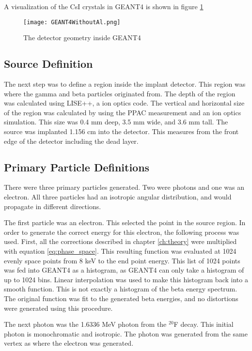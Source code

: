 \documentclass[../MaxHughesThesis.tex]{subfiles}
\begin{document}
A visualization of the CsI crystals in GEANT4 is shown in figure \ref{fig:GEANT4Det}

\begin{figure}[!htb]
	\centerline{\texttt{[image: GEANT4WithoutAl.png]}}
	\caption{The detector geometry inside GEANT4}
	\label{fig:GEANT4Det}
\end{figure}

\subsection{Source Definition}
The next step was to define a region inside the implant detector.
This region was where the gamma and beta particles originated from.
The depth of the region was calculated using LISE++, a ion optics code.
The vertical and horizontal size of the region was calculated by using the PPAC measurement and an ion optics simulation.
This size was 0.4 mm deep, 3.5 mm wide, and 3.6 mm tall.
The source was implanted 1.156 cm into the detector.
This measures from the front edge of the detector including the dead layer.

\subsection{Primary Particle Definitions}
There were three primary particles generated.
Two were photons and one was an electron.
All three particles had an isotropic angular distribution, and would propagate in different directions.

The first particle was an electron. 
This selected the point in the source region.
In order to generate the correct energy for this electron, the following process was used.
First, all the corrections described in chapter \ref{ch:theory} were multiplied with equation \ref{eq:phase_space}.
This resulting function was evaluated at 1024 evenly space points from 8 keV to the end point energy.
This list of 1024 points was fed into GEANT4 as a histogram, as GEANT4 can only take a histogram of up to 1024 bins. 
Linear interpolation was used to make this histogram back into a smooth function.
This is not exactly a histogram of the beta energy spectrum.
The original function was fit to the generated beta energies, and no distortions were generated using this procedure.

The next photon was the 1.6336 MeV photon from the $^{20}$F decay.
This initial photon is monochromatic and isotropic.
The photon was generated from the same vertex as where the electron was generated.
\end{document}
